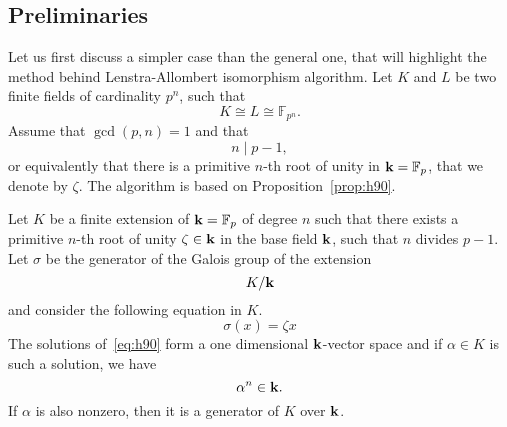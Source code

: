 %


\subsection{Preliminaries}
\label{sec:preliminaries}

Let us first discuss a simpler case than the general one, that will highlight
the method behind Lenstra-Allombert isomorphism algorithm. Let $K$ and $L$ be
two finite fields of cardinality $p^n$, such that
\[
  K\cong L\cong \mathbb{F}_{p^n}.
\]
Assume that $\gcd(p, n)=1$ and that
\[
  n\mid p-1,
\]
or equivalently that there is a primitive $n$-th root of unity in
$\mathbf{k}=\mathbb{F}_p$, that we denote by $\zeta$. The algorithm is based on
Proposition~\ref{prop:h90}.

\begin{prop}
  \label{prop:h90}
  Let $K$ be a finite extension of $\mathbf{k}=\mathbb{F}_p$ of degree $n$ such that there exists a
primitive $n$-th root of unity $\zeta\in\mathbf{k}$ in the base field $\mathbf{k}$, \ie such
that $n$ divides $p-1$. 
 Let $\sigma$ be the generator of the Galois group of the extension
 \[
   K/\mathbf{k}
 \]
 and consider the following equation in $K$.
 \begin{equation}
   \tag{H90}
   \sigma(x) = \zeta x
   \label{eq:h90}
 \end{equation}
The solutions of~\eqref{eq:h90} form a one dimensional $\mathbf{k}$-vector space and if
$\alpha\in K$ is such a solution, we have
\[
  \alpha^n\in\mathbf{k}.
\]
If $\alpha$ is also nonzero, then it is a generator of $K$ over $\mathbf{k}$.
\end{prop}
